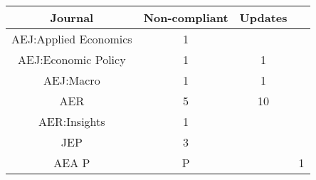
\begin{tabular}{@{\extracolsep{5pt}} ccc} 
\toprule 
Journal & Non-compliant & Updates \\ 
\midrule AEJ:Applied Economics & 1 &  \\ 
AEJ:Economic Policy & 1 & 1 \\ 
AEJ:Macro & 1 & 1 \\ 
AER & 5 & 10 \\ 
AER:Insights & 1 &  \\ 
JEP & 3 &  \\ 
AEA P&P &  & 1 \\ 
\bottomrule 
\end{tabular} 
